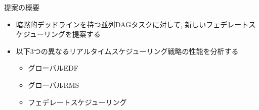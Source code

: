 
\begin{frame}{提案の概要}
    \begin{itemize}
        \item 暗黙的デッドラインを持つ並列DAGタスクに対して, 新しいフェデレートスケジューリングを提案する
        \item 以下3つの異なるリアルタイムスケジューリング戦略の性能を分析する
        \begin{itemize}
            \item グローバルEDF
            \item グローバルRMS
            \item フェデレートスケジューリング
        \end{itemize}
    \end{itemize}
\end{frame}

